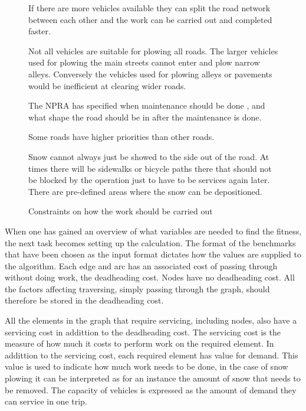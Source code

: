 \begin{figure}[thbp]
\caption{Constraints on how the work should be carried out}
\label{fig:imposed_constraints}
\begin{description}
	\item [Equipment -- Amount of vehicles available.] If there are more vehicles available they can split the road network between each other and the work can be carried out and completed faster.
	\item [Equipment -- Types of vehicles available.] Not all vehicles are suitable for plowing all roads. The larger vehicles used for plowing the main streets cannot enter and plow narrow alleys. Conversely the vehicles used for plowing alleys or pavements would be inefficient at clearing wider roads.
	\item [The weather.] The NPRA has specified when maintenance should be done \citep{svvR610}, and what shape the road should be in after the maintenance is done.
	\item [The type of road.] Some roads have higher priorities than other roads.
	\item [Where the snow can be stored.] Snow cannot always just be showed to the side out of the road. At times there will be sidewalks or bicycle paths there that should not be blocked by the operation just to have to be services again later. There are pre-defined areas where the snow can be depositioned.
\end{description}
\end{figure}


When one has gained an overview of what variables are needed to find the fitness, the next task becomes setting up the calculation. The format of the benchmarks that have been chosen as the input format dictates how the values are supplied to the algorithm. Each edge and arc has an associated cost of passing through without doing work, the deadheading cost. Nodes have no deadheading cost. All the factors affecting traversing, simply passing through the graph, should therefore be stored in the deadheading cost.

All the elements in the graph that require servicing, including nodes, also have a servicing cost in addittion to the deadheading cost. The servicing cost is the measure of how much it costs to perform work on the required element. In addittion to the servicing cost, each required element has value for demand. This value is used to indicate how much work needs to be done, in the case of snow plowing it can be interpreted as for an instance the amount of snow that needs to be removed. The capacity of vehicles is expressed as the amount of demand they can service in one trip.

